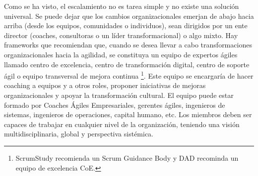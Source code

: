 Como se ha visto, el escalamiento no es tarea simple y no existe una solución universal. Se puede dejar que los cambios organizacionales emerjan de abajo hacia arriba (desde los equipos, comunidades o individuos), sean dirigidos por un ente director (coaches, consultoras o un líder transformacional) o algo mixto. Hay frameworks que recomiendan que, cuando se desea llevar a cabo transformaciones organizacionales hacia la agilidad, se constituya un equipo de expertos ágiles llamado centro de excelencia, centro de transformación digital, centro de soporte ágil o equipo transversal de mejora continua \footnote{ScrumStudy recomienda un Scrum Guidance Body y DAD recominda un equipo de excelencia CoE.}. Este equipo se encargaría de hacer coaching a equipos y a otros roles, proponer iniciativas de mejoras organizacionales y apoyar la transformación cultural. El equipo puede estar formado por Coaches Ágiles Empresariales, gerentes ágiles, ingenieros de sistemas, ingenieros de operaciones, capital humano, etc. Los miembros deben ser capaces de trabajar en cualquier nivel de la organización, teniendo una visión multidisciplinaria, global y perspectiva sistémica.
